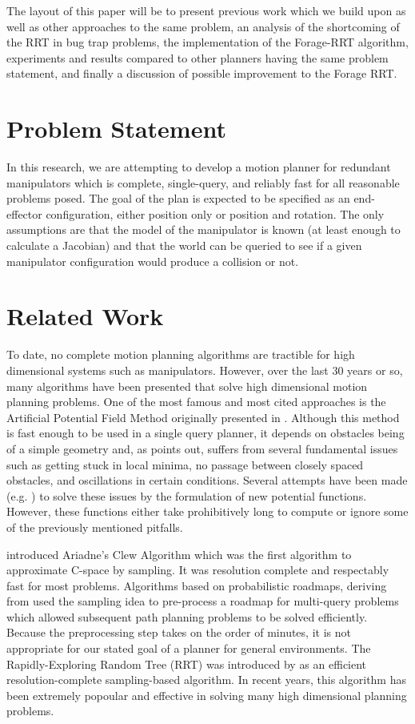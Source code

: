 \documentclass[conference]{IEEEtran}
\begin{document}
The layout of this paper will be to present previous work which we build upon as well as other approaches to the same problem, an analysis
of the shortcoming of the RRT in bug trap problems, the implementation of the Forage-RRT algorithm, experiments and results compared to
other planners having the same problem statement, and finally a discussion of possible improvement to the Forage RRT.  

\section{Problem Statement}
In this research, we are attempting to develop a motion planner for redundant manipulators which is complete, single-query, and reliably
fast for all reasonable problems posed. The goal of the plan is expected to be specified as an end-effector configuration, either position
only or position and rotation. The only assumptions are that the model of the manipulator is known (at least enough to calculate a
Jacobian) and that the world can be queried to see if a given manipulator configuration would produce a collision or not.

\section{Related Work}
To date, no complete motion planning algorithms are tractible for high dimensional systems such as manipulators. However, over the last 30
years or so, many algorithms have been presented that solve high dimensional motion planning problems. One of the most famous and most cited
approaches is the Artificial Potential Field Method originally presented in \cite{khatib86}. Although this method is fast enough to be
used in a single query planner, it depends on obstacles being of a simple geometry and, as \cite{koren91} points out, suffers from several
fundamental issues such as getting stuck in local minima, no passage between closely spaced obstacles, and oscillations in certain
conditions. Several attempts have been made (e.g. \cite{connolly90} \cite{ge00}) to solve these issues by the formulation of new potential
functions. However, these functions either take prohibitively long to compute or ignore some of the previously mentioned pitfalls. 

\cite{bessiere93} introduced Ariadne's Clew Algorithm which was the first algorithm to approximate C-space by sampling. It was resolution
complete and respectably fast for most problems. Algorithms based on probabilistic roadmaps, deriving from \cite{amato96} used the sampling
idea to pre-process a roadmap for multi-query problems which allowed subsequent path planning problems to be solved efficiently. Because the
preprocessing step takes on the order of minutes, it is not appropriate for our stated goal of a planner for general environments. The
Rapidly-Exploring Random Tree (RRT) was introduced by \cite{lavalle00} as an efficient resolution-complete sampling-based algorithm. In
recent years, this algorithm has been extremely popoular and effective in solving many high dimensional planning problems.
\end{document}
